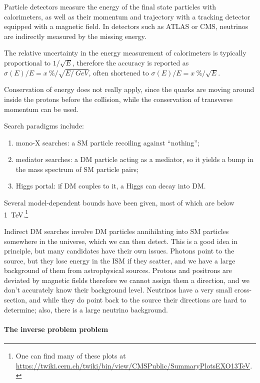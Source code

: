 \documentclass[main.tex]{subfiles}
\begin{document}
Particle detectors measure the energy of the final state particles with calorimeters, as well as their momentum and trajectory with a tracking detector equipped with a magnetic field.
In detectors such as ATLAS or CMS, neutrinos are indirectly measured by the missing energy. 

\begin{extracontent}
The relative uncertainty in the energy measurement of calorimeters is typically proportional to \(1 / \sqrt{E}\), therefore the accuracy is reported as \(\sigma (E) / E = x \SI{}{\percent} / \sqrt{ E / \SI{}{GeV}}\), often shortened to \(\sigma (E) / E = x\SI{}{\percent}/ \sqrt{E}\). 
\end{extracontent}

Conservation of energy does not really apply, since the quarks are moving around inside the protons before the collision, while the conservation of transverse momentum can be used. 

Search paradigms include: 
\begin{enumerate}
    \item mono-X searches: a SM particle recoiling against ``nothing'';
    \item mediator searches: a DM particle acting as a mediator, so it yields a bump in the mass spectrum of SM particle pairs;
    \item Higgs portal: if DM couples to it, a Higgs can decay into DM. 
\end{enumerate}

Several model-dependent bounds have been given, most of which are below \SI{1}{TeV}.\footnote{One can find many of these plots at \url{https://twiki.cern.ch/twiki/bin/view/CMSPublic/SummaryPlotsEXO13TeV}.}

Indirect DM searches involve DM particles annihilating into SM particles somewhere in the universe, which we can then detect. 
This is a good idea in principle, but many candidates have their own issues. 
Photons point to the source, but they lose energy in the ISM if they scatter, and we have a large background of them from astrophysical sources.
Protons and positrons are deviated by magnetic fields therefore we cannot assign them a direction, and we don't accurately know their background level.
Neutrinos have a very small cross-section, and while they do point back to the source their directions are hard to determine; also, there is a large neutrino background. 

\paragraph{The inverse problem problem}
\end{document}
